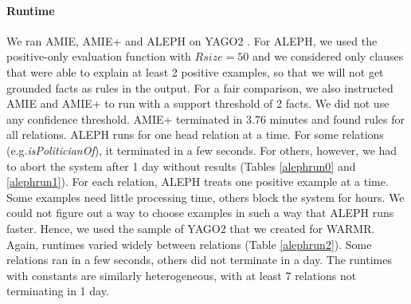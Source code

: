 \paragraph{Runtime}
We ran AMIE, AMIE+ and ALEPH on YAGO2 \cite{yago2}. For ALEPH, we used the positive-only evaluation function with $Rsize=50$ 
and we considered only clauses that were able to explain at least 2 positive examples,
so that we will not get grounded facts as rules in the output.
For a fair comparison, we also instructed AMIE and AMIE+ to run with a support threshold of 2 facts.
We did not use any confidence threshold.
AMIE+ terminated in 3.76 minutes and found rules for all relations. 
ALEPH runs for one head relation at a time. For some relations (e.g.\emph{isPoliticianOf}),
it terminated in a few seconds.
For others, however, we had to abort the system after 1 day without results (Tables \ref{alephrun0} and \ref{alephrun1}).
For each relation, ALEPH treats one positive example at a time. Some examples need little processing time, others block the system for hours.
We could not figure out a way to choose examples in such a way that ALEPH runs faster.
Hence, we used the sample of YAGO2 that we created for WARMR.
Again, runtimes varied widely between relations (Table \ref{alephrun2}).
Some relations ran in a few seconds, others did not terminate in a day.
The runtimes with constants are similarly heterogeneous, with at least 7 relations not terminating in 1 day.

